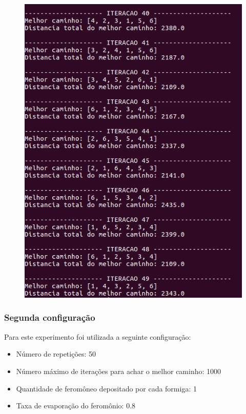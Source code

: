 \documentclass[hidelinks,12pt]{article}
\begin{document}
		\begin{figure}[!h]
			\centering
			\includegraphics[scale=0.6]{Figures/m6-1-5.png}
		\end{figure}
		
		\newpage
		
		\subsubsection{Segunda configuração}
		 	Para este experimento foi utilizada a seguinte configuração:

		 	\begin{itemize}
				\item Número de repetições: 50
				\item Número máximo de iterações para achar o melhor caminho: 1000
				\item Quantidade de feromôneo depositado por cada formiga: 1
				\item Taxa de evaporação do feromônio: 0.8
			\end{itemize}
\end{document}
